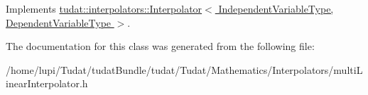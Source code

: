 Implements \hyperlink{classtudat_1_1interpolators_1_1Interpolator_a0b8c3f199c7a2297928936f00790f190}{tudat\+::interpolators\+::\+Interpolator$<$ Independent\+Variable\+Type, Dependent\+Variable\+Type $>$}.



The documentation for this class was generated from the following file\+:\begin{DoxyCompactItemize}
\item 
/home/lupi/\+Tudat/tudat\+Bundle/tudat/\+Tudat/\+Mathematics/\+Interpolators/multi\+Linear\+Interpolator.\+h\end{DoxyCompactItemize}
